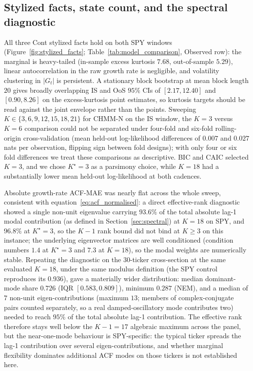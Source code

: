 \subsection{Stylized facts, state count, and the spectral diagnostic}
\label{sec:res_stylized}

All three Cont stylized facts hold on both SPY windows (Figure~\ref{fig:stylized_facts}; Table~\ref{tab:model_comparison}, Observed row): the marginal is heavy-tailed (in-sample excess kurtosis $7.68$, out-of-sample $5.29$), linear autocorrelation in the raw growth rate is negligible, and volatility clustering in $|G_t|$ is persistent. A stationary block bootstrap at mean block length $20$ gives broadly overlapping IS and OoS $95\%$ CIs of $[2.17, 12.40]$ and $[0.90, 8.26]$ on the excess-kurtosis point estimates, so kurtosis targets should be read against the joint envelope rather than the points. Sweeping $K \in \{3, 6, 9, 12, 15, 18, 21\}$ for CHMM-N on the IS window, the $K = 3$ versus $K = 6$ comparison could not be separated under four-fold and six-fold rolling-origin cross-validation (mean held-out log-likelihood differences of $0.007$ and $0.027$ nats per observation, flipping sign between fold designs); with only four or six fold differences we treat these comparisons as descriptive. BIC and CAIC selected $K = 3$, and we chose $K^\star = 3$ as a parsimony choice, while $K = 18$ had a substantially lower mean held-out log-likelihood at both cadences.

Absolute growth-rate ACF-MAE was nearly flat across the whole sweep, consistent with equation~\eqref{eq:acf_normalised}: a direct effective-rank diagnostic showed a single non-unit eigenvalue carrying $93.6\%$ of the total absolute lag-1 modal contribution (as defined in Section~\ref{sec:spectral}) at $K = 18$ on SPY, and $96.8\%$ at $K^\star = 3$, so the $K - 1$ rank bound did not bind at $K \ge 3$ on this instance; the underlying eigenvector matrices are well conditioned (condition numbers $1.4$ at $K^\star = 3$ and $7.3$ at $K = 18$), so the modal weights are numerically stable. Repeating the diagnostic on the 30-ticker cross-section at the same evaluated $K = 18$, under the same modulus definition (the SPY control reproduces its $0.936$), gave a materially wider distribution: median dominant-mode share $0.726$ (IQR $[0.583, 0.809]$), minimum $0.287$ (NEM), and a median of $7$ non-unit eigen-contributions (maximum $13$; members of complex-conjugate pairs counted separately, so a real damped-oscillatory mode contributes two) needed to reach $95\%$ of the total absolute lag-1 contribution. The effective rank therefore stays well below the $K - 1 = 17$ algebraic maximum across the panel, but the near-one-mode behaviour is SPY-specific: the typical ticker spreads the lag-1 contribution over several eigen-contributions, and whether marginal flexibility dominates additional ACF modes on those tickers is not established here.

